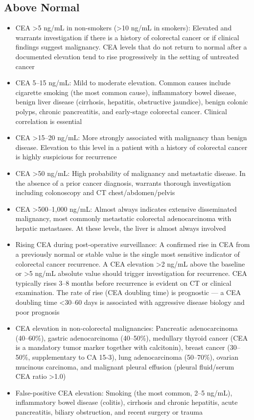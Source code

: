 \subsection*{Above Normal}
\begin{itemize}
  \item CEA >5 ng/mL in non-smokers (>10 ng/mL in smokers): Elevated and warrants investigation if there is a history of colorectal cancer or if clinical findings suggest malignancy. CEA levels that do not return to normal after a documented elevation tend to rise progressively in the setting of untreated cancer
  \item CEA 5--15 ng/mL: Mild to moderate elevation. Common causes include cigarette smoking (the most common cause), inflammatory bowel disease, benign liver disease (cirrhosis, hepatitis, obstructive jaundice), benign colonic polyps, chronic pancreatitis, and early-stage colorectal cancer. Clinical correlation is essential
  \item CEA >15--20 ng/mL: More strongly associated with malignancy than benign disease. Elevation to this level in a patient with a history of colorectal cancer is highly suspicious for recurrence
  \item CEA >50 ng/mL: High probability of malignancy and metastatic disease. In the absence of a prior cancer diagnosis, warrants thorough investigation including colonoscopy and CT chest/abdomen/pelvis
  \item CEA >500--1,000 ng/mL: Almost always indicates extensive disseminated malignancy, most commonly metastatic colorectal adenocarcinoma with hepatic metastases. At these levels, the liver is almost always involved
  \item Rising CEA during post-operative surveillance: A confirmed rise in CEA from a previously normal or stable value is the single most sensitive indicator of colorectal cancer recurrence. A CEA elevation >2 ng/mL above the baseline or >5 ng/mL absolute value should trigger investigation for recurrence. CEA typically rises 3--8 months before recurrence is evident on CT or clinical examination. The rate of rise (CEA doubling time) is prognostic --- a CEA doubling time <30--60 days is associated with aggressive disease biology and poor prognosis
  \item CEA elevation in non-colorectal malignancies: Pancreatic adenocarcinoma (40--60\%), gastric adenocarcinoma (40--50\%), medullary thyroid cancer (CEA is a mandatory tumor marker together with calcitonin), breast cancer (30--50\%, supplementary to CA 15-3), lung adenocarcinoma (50--70\%), ovarian mucinous carcinoma, and malignant pleural effusion (pleural fluid/serum CEA ratio >1.0)
  \item False-positive CEA elevation: Smoking (the most common, 2--5 ng/mL), inflammatory bowel disease (colitis), cirrhosis and chronic hepatitis, acute pancreatitis, biliary obstruction, and recent surgery or trauma
\end{itemize}

